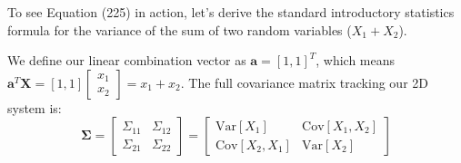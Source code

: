 \documentclass{article}
\begin{document}
To see Equation (225) in action, let's derive the standard introductory statistics formula for the variance of the sum of two random variables ($X_1 + X_2$).

We define our linear combination vector as $\mathbf{a} = [1, 1]^T$, which means $\mathbf{a}^T\mathbf{X} = [1, 1]\begin{bmatrix}x_1 \\ x_2\end{bmatrix} = x_1 + x_2$. The full covariance matrix tracking our 2D system is:
\begin{equation*}
\boldsymbol{\Sigma} = 
\begin{bmatrix} 
\Sigma_{11} & \Sigma_{12} \\ 
\Sigma_{21} & \Sigma_{22} 
\end{bmatrix} = 
\begin{bmatrix} 
\text{Var}[X_1] & \text{Cov}[X_1, X_2] \\ 
\text{Cov}[X_2, X_1] & \text{Var}[X_2] 
\end{bmatrix}
\end{equation*}
\end{document}
